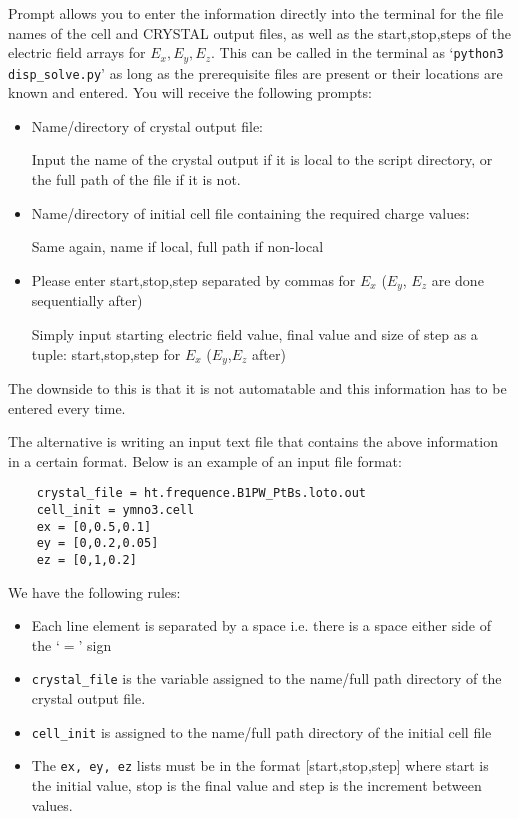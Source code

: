 Prompt allows you to enter the information directly into the terminal for the file names of the cell and CRYSTAL output files, as well as the start,stop,steps of the electric field arrays for $E_x,E_y,E_z$. This can be called in the terminal as `\texttt{python3 disp\_solve.py}' as long as the prerequisite files are present or their locations are known and entered. You will receive the following prompts:

\begin{itemize}
	\item Name/directory of crystal output file:
	
	Input the name of the crystal output if it is local to the script directory, or the full path of the file if it is not.
	
	\item Name/directory of initial cell file containing the required charge values:
	
	Same again, name if local, full path if non-local
	
	\item Please enter start,stop,step separated by commas for $E_x$ ($E_y$, $E_z$ are done sequentially after)
	
	Simply input starting electric field value, final value and size of step as a tuple: start,stop,step for $E_x$ ($E_y$,$E_z$ after)
\end{itemize}

The downside to this is that it is not automatable and this information has to be entered every time.

The alternative is writing an input text file that contains the above information in a certain format. Below is an example of an input file format:

\begin{lstlisting}
	crystal_file = ht.frequence.B1PW_PtBs.loto.out
	cell_init = ymno3.cell
	ex = [0,0.5,0.1]
	ey = [0,0.2,0.05]
	ez = [0,1,0.2]
\end{lstlisting}

We have the following rules:

\begin{itemize}
	\item Each line element is separated by a space i.e. there is a space either side of the `$=$' sign
	\item \texttt{crystal\_file} is the variable assigned to the name/full path directory of the crystal output file.
	\item \texttt{cell\_init} is assigned to the name/full path directory of the initial cell file
	\item The \texttt{ex, ey, ez} lists must be in the format [start,stop,step] where start is the initial value, stop is the final value and step is the increment between values.
\end{itemize}


